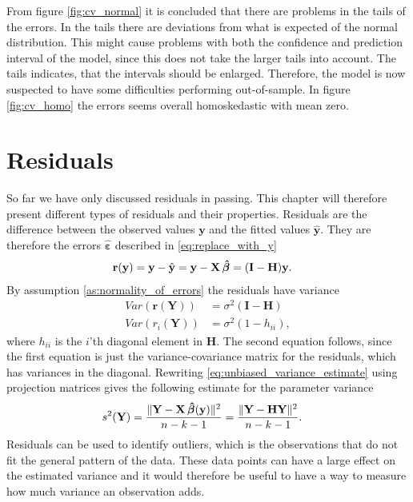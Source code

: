 From figure \ref{fig:cv_normal} it is concluded that there are problems in the tails of the errors. 
In the tails there are deviations from what is expected of the normal distribution. 
This might cause problems with both the confidence and prediction interval of the model, since this does not take the larger tails into account.
The tails indicates, that the intervals should be enlarged.
Therefore, the model is now suspected to have some difficulties performing out-of-sample. 
In figure \ref{fig:cv_homo} the errors seems overall homoskedastic with mean zero. 

\section{Residuals}\label{subsec:residuals}
So far we have only discussed residuals in passing. 
This chapter will therefore present different types of residuals and their properties.
Residuals are the difference between the observed values $\textbf{y}$ and the fitted values $\hat{\textbf{y}}$. They are therefore the errors $\boldsymbol{\hat{\varepsilon}}$ described in \eqref{eq:replace_with_y}
\begin{align*}
    \textbf{r}(\textbf{y}) &= \textbf{y} - \hat{\textbf{y}} = \textbf{y} - \textbf{X} \operatorname{\boldsymbol{\hat{\beta}}} = (\textbf{I} - \textbf{H}) \textbf{y}.
\end{align*}
By assumption \ref{as:normality_of_errors} the residuals have variance
\begin{align*}
    Var(\textbf{r}(\textbf{Y})) &= \sigma^2 (\textbf{I} - \textbf{H}) \\
    Var(r_i(\textbf{Y})) &= \sigma^2(1 - h_{ii}),
\end{align*}
where $h_{ii}$ is the $i$'th diagonal element in $\textbf{H}$. The second equation follows, since the first equation is just the variance-covariance matrix for the residuals, which has variances in the diagonal.
Rewriting \eqref{eq:unbiased_variance_estimate} using projection matrices gives the following estimate for the parameter variance
\begin{align*}
    s^2(\textbf{Y}) &= \frac{\| \textbf{Y} - \textbf{X} \operatorname{\boldsymbol{\hat{\beta}}} (\textbf{y}) \|^2 }{n-k-1} = \frac{\| \textbf{Y} - \textbf{H} \textbf{Y} \|^2}{n-k-1} .
\end{align*}
Residuals can be used to identify outliers, which is the observations that do not fit the general pattern of the data.
These data points can have a large effect on the estimated variance and it would therefore be useful to have a way to measure how much variance an observation adds.
